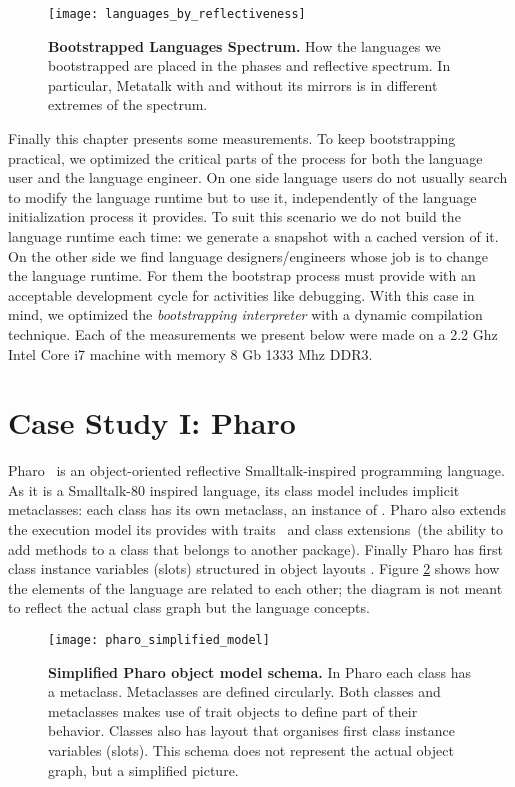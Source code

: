 \begin{figure}[ht]
\center
\texttt{[image: languages\_by\_reflectiveness]}
\caption{\textbf{Bootstrapped Languages Spectrum.} How the languages we bootstrapped are placed in the phases and reflective spectrum. In particular, Metatalk with and without its mirrors is in different extremes of the spectrum.\label{fig:languages_spectrum}}
\end{figure}

Finally this chapter presents some measurements. To keep bootstrapping practical, we optimized the critical parts of the process for both the language user and the language engineer. On one side language users do not usually search to modify the language runtime but to use it, independently of the language initialization process it provides. To suit this scenario we do not build the language runtime each time: we generate a snapshot with a cached version of it. On the other side we find language designers/engineers whose job is to change the language runtime. For them the bootstrap process must provide with an acceptable development cycle for activities like debugging. With this case in mind, we optimized the \emph{bootstrapping interpreter} with a dynamic compilation technique. Each of the measurements we present below were made on a 2.2 Ghz Intel Core i7 machine with memory 8 Gb 1333 Mhz DDR3.

\section{Case Study I: Pharo}\label{sec:bootstrap_pharo}

Pharo~\cite{Blac09a} is an object-oriented reflective Smalltalk-inspired programming language. As it is a Smalltalk-80 inspired language, its class model includes implicit metaclasses: each class has its own metaclass, an instance of . Pharo also extends the execution model its \VM provides with traits~\cite{Scha03a} and class extensions~(\ie the ability to add methods to a class that belongs to another package). Finally Pharo has first class instance variables (slots) structured in object layouts \cite{Verw11a}. Figure \ref{fig:pharo_simplified_model} shows how the elements of the language are related to each other; the diagram is not meant to reflect the actual class graph but the language concepts.

\begin{figure}[ht]
\center
\texttt{[image: pharo\_simplified\_model]}
\caption{\textbf{Simplified Pharo object model schema.} In Pharo each class has a metaclass. Metaclasses are defined circularly. Both classes and metaclasses makes use of trait objects to define part of their behavior. Classes also has layout that organises first class instance variables (slots). This schema does not represent the actual object graph, but a simplified picture.\label{fig:pharo_simplified_model}}
\end{figure}


